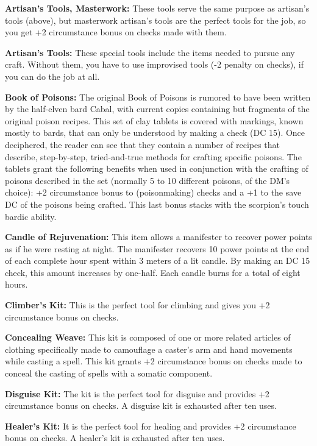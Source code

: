 \textbf{Artisan's Tools, Masterwork:} These tools serve the same purpose as artisan's tools (above), but masterwork artisan's tools are the perfect tools for the job, so you get +2 circumstance bonus on  checks made with them.

\textbf{Artisan's Tools:} These special tools include the items needed to pursue any craft. Without them, you have to use improvised tools (-2 penalty on  checks), if you can do the job at all.

\textbf{Book of Poisons:} The original Book of Poisons is rumored to have been written by the half-elven bard Cabal, with current copies containing but fragments of the original poison recipes. This set of clay tablets is covered with markings, known mostly to bards, that can only be understood by making a  check (DC 15). Once deciphered, the reader can see that they contain a number of recipes that describe, step-by-step, tried-and-true methods for crafting specific poisons. The tablets grant the following benefits when used in conjunction with the crafting of poisons described in the set (normally 5 to 10 different poisons, of the DM's choice): +2 circumstance bonus to  (poisonmaking) checks and a +1 to the save DC of the poisons being crafted. This last bonus stacks with the scorpion's touch bardic ability.

\textbf{Candle of Rejuvenation:} This item allows a manifester to recover power points as if he were resting at night. The manifester recovers 10 power points at the end of each complete hour spent within 3 meters of a lit candle. By making an  DC 15 check, this amount increases by one-half. Each candle burns for a total of eight hours.

\textbf{Climber's Kit:} This is the perfect tool for climbing and gives you +2 circumstance bonus on  checks.

\textbf{Concealing Weave:} This kit is composed of one or more related articles of clothing specifically made to camouflage a caster's arm and hand movements while casting a spell. This kit grants +2 circumstance bonus on  checks made to conceal the casting of spells with a somatic component.

\textbf{Disguise Kit:} The kit is the perfect tool for disguise and provides +2 circumstance bonus on  checks. A disguise kit is exhausted after ten uses.

\textbf{Healer's Kit:} It is the perfect tool for healing and provides +2 circumstance bonus on  checks. A healer's kit is exhausted after ten uses.

